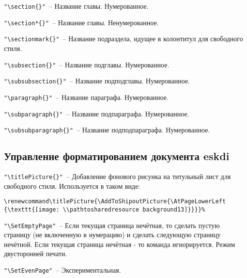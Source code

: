 \noindent \verb|"\section{}"|~– Название главы. Нумерованное.

\noindent \verb|"\section*{}"|~– Название главы. Ненумерованное.

\noindent \verb|"\sectionmark{}"|~– Название подраздела, идущее в колонтитул для свободного стиля.

\noindent \verb|"\subsection{}"|~– Название подглавы. Нумерованное.

\noindent \verb|"\subsubsection{}"|~– Название подподглавы. Нумерованное.

\noindent \verb|"\paragraph{}"|~– Название параграфа. Нумерованное.

\noindent \verb|"\subparagraph{}"|~– Название подпараграфа. Нумерованное.

\noindent \verb|"\subsubparagraph{}"|~– Название подподпараграфа. Нумерованное.




\subsection{Управление форматированием документа eskdi}

\noindent \verb|"\titlePicture{}"|~– Добавление фонового рисунка на титульный лист для свободного стиля. Используется в таком виде:
\begin{Verbatim}[frame=single]
\renewcommand\titlePicture{\AddToShipoutPicture{\AtPageLowerLeft
{\texttt{[image: \\pathtosharedresource background13]}}}}%
\end{Verbatim}


\noindent \verb|"\SetEmptyPage"|~– Если текущая страница нечётная, то сделать пустую страницу (не включенную в нумерацию) и сделать следующую страницу нечётной. Если текущая страница нечётная - то команда игнорируется. Режим двусторонней печати. 

\noindent \verb|"\SetEvenPage"|~– Экспериментальная.













